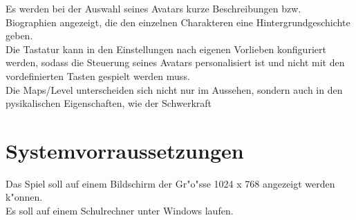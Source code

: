 \documentclass[a4paper, 11pt]{article}
\begin{document}
    \noindent
    Es werden bei der Auswahl seines Avatars kurze Beschreibungen bzw. Biographien angezeigt, die den einzelnen Charakteren
    eine Hintergrundgeschichte geben.\\

    \noindent
    Die Tastatur kann in den Einstellungen nach eigenen Vorlieben konfiguriert werden, sodass die Steuerung seines Avatars
    personalisiert ist und nicht mit den vordefinierten Tasten gespielt werden muss.\\

    \noindent
    Die Maps/Level unterscheiden sich nicht nur im Aussehen, sondern auch in den pysikalischen Eigenschaften, wie der
    Schwerkraft

    \section{Systemvorraussetzungen}\label{sec:systemvorraussetungen}

    Das Spiel soll auf einem Bildschirm der Gr"o"ss{}e 1024 x 768 angezeigt werden k"onnen.\\

    \noindent
    Es soll auf einem Schulrechner unter Windows laufen.
\end{document}
